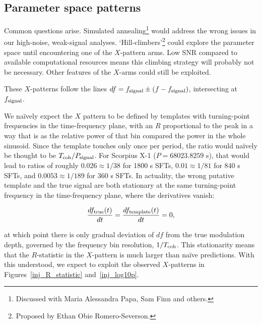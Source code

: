 \subsection{Parameter space patterns}
Common questions arise. 
Simulated annealing\footnote{Discussed with Maria Alessandra Papa, Sam Finn and others.} would address the wrong issues in our high-noise, weak-signal analyses. 
`Hill-climbers'\footnote{Proposed by Ethan Obie Romero-Severson.} could explore the parameter space until encountering one of the $X$-pattern arms. 
Low SNR compared to available computational resources means this climbing strategy will probably not be necessary. 
Other features of the $X$-arms could still be exploited.

These $X$-patterns follow the lines $df = f_{\textup{signal}} \pm (f - f_\textup{signal})$, intersecting at $f_\textup{signal}$.

We na\"{i}vely expect the $X$ pattern to be defined by templates with turning-point frequencies in the time-frequency plane, with an $R$ proportional to the peak in a way that is as the relative power of that bin compared the power in the whole sinusoid. 
Since the template touches only once per period, the ratio would na\"{i}vely be thought to be $T_{\textup{coh}} / P_{\textup{signal}}$. 
For Scorpius X-1 ($P = 68023.8259$ s), that would lead to ratios of roughly $0.026 \approx 1/38$ for 1800 s SFTs, $0.01 \approx 1/81$ for 840 s SFTs, and $0.0053 \approx 1/189$ for 360 s SFTs.
In actuality, the wrong putative template and the true signal are both stationary at the same turning-point frequency in the time-frequency plane, where the derivatives vanish:

\begin{equation}
\frac{df_\textup{true} (t)}{dt} = \frac{df_\textup{template}(t)}{dt} = 0,
\end{equation}

\noindent at which point there is only gradual deviation of $df$ from the true modulation depth, governed by the frequency bin resolution, $1/T_\textup{coh}$. 
This stationarity means that the $R$-statistic in the $X$-pattern is much larger than na\"{i}ve predictions.
With this understood, we expect to exploit the observed $X$-patterns in Figures~\ref{inj_R_statistic} and~\ref{inj_log10p}.

